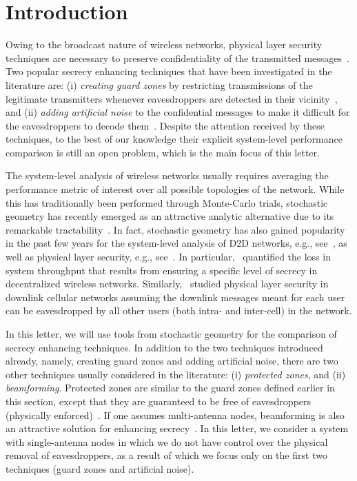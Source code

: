 \documentclass[final]{IEEEtran}
\begin{document}
\section{Introduction} \label{sec:intro}
Owing to the broadcast nature of wireless networks, physical layer security techniques are necessary to preserve confidentiality of the transmitted messages~\cite{5934342,zhou2010secure,7247765,6259796}. Two popular secrecy enhancing techniques that have been investigated in the literature are: (i) {\em creating guard zones} by restricting transmissions of the legitimate transmitters whenever eavesdroppers are detected in their vicinity~\cite{5934342}, and (ii) {\em adding artificial noise} to the confidential messages to make it difficult for the eavesdroppers to decode them~\cite{zhou2010secure}. Despite the attention received by these techniques, to the best of our knowledge their explicit system-level performance comparison is still an open problem, which is the main focus of this letter. 

The system-level analysis of wireless networks usually requires averaging the performance metric of interest over all possible topologies of the network. While this has traditionally been performed through Monte-Carlo trials, stochastic geometry has recently emerged as an attractive analytic alternative due to its remarkable tractability~\cite{AndGupJ2016}. In fact, stochastic geometry has also gained popularity in the past few years for the system-level analysis of D2D networks, e.g., see~\cite{7073589,7056528,7446343}, as well as physical layer security, e.g., see~\cite{5934342,geraci2014physical}. In particular,~\cite{5934342} quantified the loss in system throughput that results from ensuring a specific level of secrecy in decentralized wireless networks. Similarly,~\cite{geraci2014physical} studied physical layer security in downlink cellular networks assuming the downlink messages meant for each user can be eavesdropped by all other users (both intra- and inter-cell) in the network. 

In this letter, we will use tools from stochastic geometry for the comparison of secrecy enhancing techniques. In addition to the two techniques introduced already, namely, creating guard zones and adding artificial noise, there are two other techniques usually considered in the literature: (i) {\em protected zones}, and (ii) {\em beamforming}. Protected zones are similar to the guard zones defined earlier in this section, except that they are guaranteed to be free of eavesdroppers (physically enforced)~\cite{7247765}. If one assumes multi-antenna nodes, beamforming is also an attractive solution for enhancing secrecy~\cite{6259796}. In this letter, we consider a system with single-antenna nodes in which we do not have control over the physical removal of eavesdroppers, as a result of which we focus only on the first two techniques (guard zones and artificial noise).
\end{document}
